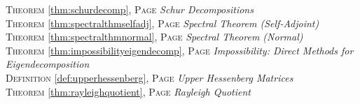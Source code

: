 \begin{multicols}{2}
{\textsc{Theorem} \ref{thm:schurdecomp}, \textsc{Page} \pageref{thm:schurdecomp} \textit{Schur Decompositions} \\
\textsc{Theorem} \ref{thm:spectralthmselfadj}, \textsc{Page} \pageref{thm:spectralthmselfadj} \textit{Spectral Theorem (Self-Adjoint)} \\
\textsc{Theorem} \ref{thm:spectralthmnormal}, \textsc{Page} \pageref{thm:spectralthmnormal} \textit{Spectral Theorem (Normal)} \\
\textsc{Theorem} \ref{thm:impossibilityeigendecomp}, \textsc{Page} \pageref{thm:impossibilityeigendecomp} \textit{Impossibility: Direct Methods for Eigendecomposition} \\
\textsc{Definition} \ref{def:upperhessenberg}, \textsc{Page} \pageref{def:upperhessenberg} \textit{Upper Hessenberg Matrices} \\
\textsc{Theorem} \ref{thm:rayleighquotient}, \textsc{Page} \pageref{thm:rayleighquotient} \textit{Rayleigh Quotient} \\

      }
\end{multicols}

